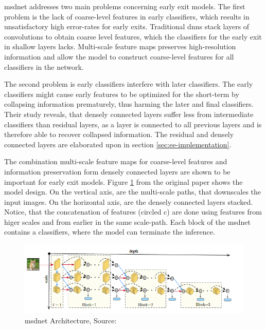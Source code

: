\gls{msdnet} \cite{huang_densely_2016} addresses two main problems concerning early exit models. The first problem is the lack of coarse-level features in early classifiers, which results in unsatisfactory high error-rates for early exits. Traditional \gls{dnn}s stack layers of convolutions to obtain coarse level features, which the classifiers for the early exit in shallow layers lacks. Multi-scale feature maps preserves high-resolution information and allow the model to construct coarse-level features for all classifiers in the network. 

The second problem is early classifiers interfere with later classifiers. The early classifiers might cause early features to be optimized for the short-term by collapsing information prematurely, thus harming the later and final classifiers. Their study reveals, that densely connected layers suffer less from intermediate classifiers than residual layers, as a layer is connected to all previous layers and is therefore able to recover collapsed information. The residual and densely connected layers are elaborated upon in section \ref{sec:ee-implementation}.


The combination multi-scale feature maps for coarse-level features and information preservation form densely connected layers are shown to be important for early exit models. Figure \ref{fig:msdnet} from the original paper shows the model design. On the vertical axis, are the multi-scale paths, that downscales the input images. On the horizontal axis, are the densely connected layers stacked. Notice, that the concatenation of features (circled c) are done using features from higer scales and from earlier in the same scale-path. Each block of the \gls{msdnet} contains a classifiers, where the model can terminate the inference.
\begin{figure}
	\centering
	\includegraphics[width=\linewidth]{figures/models/msdnet}
	\caption[\gls{msdnet} Architecture]{\gls{msdnet} Architecture, Source:  \cite{huang_multi-scale_2017}}
	\label{fig:msdnet}
\end{figure}

